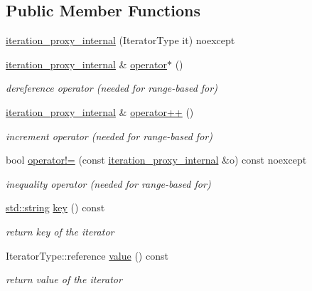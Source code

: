 \subsection*{Public Member Functions}
\begin{DoxyCompactItemize}
\item 
\hyperlink{classnlohmann_1_1detail_1_1iteration__proxy_1_1iteration__proxy__internal_a6db8effc48d1a83fa10a3d4e1a30c931}{iteration\+\_\+proxy\+\_\+internal} (Iterator\+Type it) noexcept
\item 
\hyperlink{classnlohmann_1_1detail_1_1iteration__proxy_1_1iteration__proxy__internal}{iteration\+\_\+proxy\+\_\+internal} \& \hyperlink{classnlohmann_1_1detail_1_1iteration__proxy_1_1iteration__proxy__internal_a008e69c6ba945489720a946619dcc620}{operator$\ast$} ()
\begin{DoxyCompactList}\small\item\em dereference operator (needed for range-\/based for) \end{DoxyCompactList}\item 
\hyperlink{classnlohmann_1_1detail_1_1iteration__proxy_1_1iteration__proxy__internal}{iteration\+\_\+proxy\+\_\+internal} \& \hyperlink{classnlohmann_1_1detail_1_1iteration__proxy_1_1iteration__proxy__internal_a54a98e7cb1f015cc38dd69205f4651c0}{operator++} ()
\begin{DoxyCompactList}\small\item\em increment operator (needed for range-\/based for) \end{DoxyCompactList}\item 
bool \hyperlink{classnlohmann_1_1detail_1_1iteration__proxy_1_1iteration__proxy__internal_ad96488c5cb13952a183324f9f34598d1}{operator!=} (const \hyperlink{classnlohmann_1_1detail_1_1iteration__proxy_1_1iteration__proxy__internal}{iteration\+\_\+proxy\+\_\+internal} \&o) const noexcept
\begin{DoxyCompactList}\small\item\em inequality operator (needed for range-\/based for) \end{DoxyCompactList}\item 
\hyperlink{namespacenlohmann_1_1detail_a1ed8fc6239da25abcaf681d30ace4985ab45cffe084dd3d20d928bee85e7b0f21}{std\+::string} \hyperlink{classnlohmann_1_1detail_1_1iteration__proxy_1_1iteration__proxy__internal_a17f404f04637ad9d3df801a59393e516}{key} () const
\begin{DoxyCompactList}\small\item\em return key of the iterator \end{DoxyCompactList}\item 
Iterator\+Type\+::reference \hyperlink{classnlohmann_1_1detail_1_1iteration__proxy_1_1iteration__proxy__internal_ae9fa7261205b9247c9d2d28d6b4ebd63}{value} () const
\begin{DoxyCompactList}\small\item\em return value of the iterator \end{DoxyCompactList}\end{DoxyCompactItemize}
